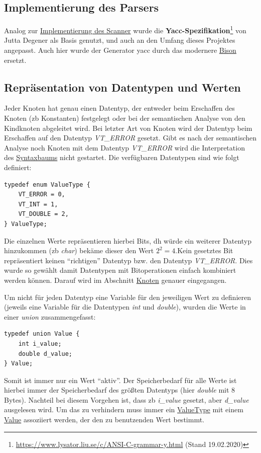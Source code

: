 \documentclass[oneside]{ausarbeitung}
\begin{document}
\subsection{Implementierung des Parsers}
\label{sub:impl_parser}
Analog zur \hyperref[sub:impl_scanner]{Implementierung des Scanner} wurde die \textbf{Yacc-Spezifikation}\footnote{\url{https://www.lysator.liu.se/c/ANSI-C-grammar-y.html} (Stand 19.02.2020)} von Jutta Degener als Basis genutzt, und auch an den Umfang dieses Projektes angepasst. Auch hier wurde der Generator yacc durch das modernere \hyperref[sub:bison]{Bison} ersetzt.

\subsection{Repräsentation von Datentypen und Werten}
\label{sub:value_types}
Jeder Knoten hat genau einen Datentyp, der entweder beim Erschaffen des Knoten (\ac{zb} Konstanten) festgelegt oder bei der semantischen Analyse von den Kindknoten abgeleitet wird. Bei letzter Art von Knoten wird der Datentyp beim Erschaffen auf den Datentyp \textit{VT\_ERROR} gesetzt. Gibt es nach der semantischen Analyse noch Knoten mit dem Datentyp \textit{VT\_ERROR} wird die Interpretation des \hyperref[sub:syntax_tree]{Syntaxbaums} nicht gestartet. Die verfügbaren Datentypen sind wie folgt definiert:
\begin{lstlisting}[label={lst:ValueType}, caption={ValueType}]
typedef enum ValueType {
    VT_ERROR = 0,
    VT_INT = 1,
    VT_DOUBLE = 2,
} ValueType;
\end{lstlisting}
Die einzelnen Werte repräsentieren hierbei Bits, \ac{dh} würde ein weiterer Datentyp hinzukommen (\ac{zb} \textit{char}) bekäme dieser den Wert $2^2 = 4$.Kein gesetztes Bit repräsentiert keinen "`richtigen"' Datentyp bzw. den Datentyp \textit{VT\_ERROR}. Dies wurde so gewählt damit Datentypen mit Bitoperationen einfach kombiniert werden können. Darauf wird im Abschnitt \hyperref[sub:node]{Knoten} genauer eingegangen.

Um nicht für jeden Datentyp eine Variable für den jeweiligen Wert zu definieren (jeweils eine Variable für die Datentypen \textit{int} und \textit{double}), wurden die Werte in einer \textit{union} zusammengefasst:
\begin{lstlisting}[label={lst:Value}, caption={Value}]
typedef union Value {
    int i_value;
    double d_value;
} Value;
\end{lstlisting}
Somit ist immer nur ein Wert "`aktiv"'. Der Speicherbedarf für alle Werte ist hierbei immer der Speicherbedarf des größten Datentyps (hier \textit{double} mit 8 Bytes). Nachteil bei diesem Vorgehen ist, dass \ac{zb} \textit{i\_value} gesetzt, aber \textit{d\_value} ausgelesen wird. Um das zu verhindern muss immer ein \hyperref[lst:ValueType]{ValueType} mit einem \hyperref[lst:Value]{Value} assoziiert werden, der den zu benutzenden Wert bestimmt.
\end{document}
